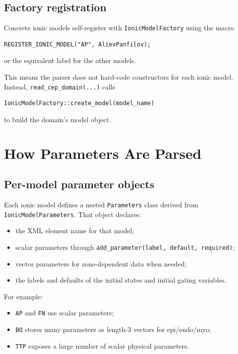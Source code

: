 \documentclass[11pt]{article}
\begin{document}
\subsection{Factory registration}

Concrete ionic models self-register with \texttt{IonicModelFactory} using the macro
\begin{verbatim}
REGISTER_IONIC_MODEL("AP", AlievPanfilov);
\end{verbatim}
or the equivalent label for the other models.

This means the parser does not hard-code constructors for each ionic model. Instead, \texttt{read\_cep\_domain(...)} calls
\begin{verbatim}
IonicModelFactory::create_model(model_name)
\end{verbatim}
to build the domain's model object.

\section{How Parameters Are Parsed}

\subsection{Per-model parameter objects}

Each ionic model defines a nested \texttt{Parameters} class derived from \texttt{IonicModelParameters}. That object declares:
\begin{itemize}[leftmargin=*]
\item the XML element name for that model;
\item scalar parameters through \texttt{add\_parameter(label, default, required)};
\item vector parameters for zone-dependent data when needed;
\item the labels and defaults of the initial states and initial gating variables.
\end{itemize}

For example:
\begin{itemize}[leftmargin=*]
\item \texttt{AP} and \texttt{FN} use scalar parameters;
\item \texttt{BO} stores many parameters as length-3 vectors for epi/endo/myo;
\item \texttt{TTP} exposes a large number of scalar physical parameters.
\end{itemize}
\end{document}
